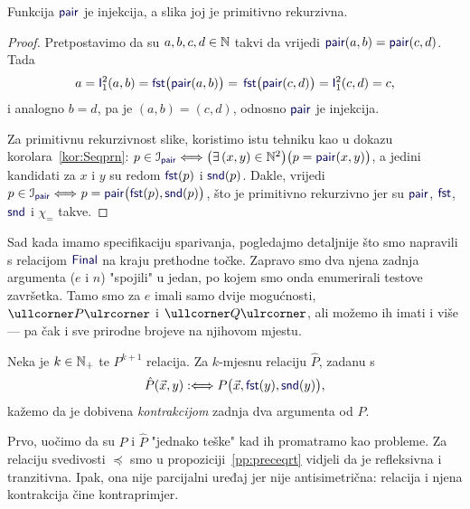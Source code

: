 \begin{propozicija}[{name=[injektivnost i primitivna rekurzivnost slike sparivanja]}]
Funkcija $\f{pair}$ je injekcija, a slika joj je primitivno rekurzivna.
\end{propozicija}
\begin{proof}
Pretpostavimo da su $a,b,c,d\in{\mathbb N}$ takvi da vrijedi $\f{pair}(a,b)=\f{pair}(c,d)$. Tada
\begin{equation}
    a=\f I_1^2(a,b)=\f{fst}\bigl(\f{pair}(a,b)\bigr)=\,
    \f{fst}\bigl(\f{pair}(c,d)\bigr)=\f I_1^2(c,d)=c\text,
\end{equation}
i analogno $b=d$, pa je $(a,b)=(c,d)$, odnosno $\f{pair}$ je injekcija.

	Za primitivnu rekurzivnost slike, koristimo istu tehniku kao u dokazu korolara~\ref{kor:Seqprn}: $p\in\im{\f{pair}}\Longleftrightarrow\bigl(\exists\,(x,y)\in\N^2\bigr)\bigl(p=\f{pair}(x,y)\bigr)$, a jedini kandidati za $x$ i $y$ su redom $\f{fst}(p)$ i $\f{snd}(p)$. Dakle, vrijedi $p\in\im{\f{pair}}\Longleftrightarrow\mspace{1mu}p=\f{pair}\bigl(\f{fst}(p),\f{snd}(p)\bigr)$,
što je primitivno rekurzivno jer su $\f{pair}$, $\f{fst}$, $\f{snd}$ i $\chi_=$ takve.
\end{proof}

Sad kada imamo specifikaciju sparivanja, pogledajmo detaljnije što smo napravili s relacijom $\f{Final}$ na kraju prethodne točke. Zapravo smo dva njena zadnja argumenta ($e$ i $n$) "spojili" u jedan, po kojem smo onda enumerirali testove završetka. Tamo smo za $e$ imali samo dvije mogućnosti, $\kprog P$ i $\kprog Q$, ali možemo ih imati i više --- pa čak i sve prirodne brojeve na njihovom mjestu.

\begin{definicija}[{name=[kontrakcija brojevne relacije]}]
Neka je $k\in{\mathbb N}_+$ te $P^{k+1}$ relacija. Za $k$-mjesnu relaciju $\hat P$, zadanu s
\begin{equation}
    \hat P(\vec x,y):\Longleftrightarrow P\bigl(\vec x,\f{fst}(y),\f{snd}(y)\bigr)\text,
\end{equation}
kažemo da je dobivena \emph{kontrakcijom} zadnja dva argumenta od $P$.
\end{definicija}

Prvo, uočimo da su $P$ i $\hat P$ "jednako teške" kad ih promatramo kao probleme. Za relaciju svedivosti $\preceq$ smo u propoziciji~\ref{pp:preceqrt} vidjeli da je refleksivna i tranzitivna. Ipak, ona nije parcijalni uređaj jer nije antisimetrična: relacija i njena kontrakcija čine kontraprimjer.

